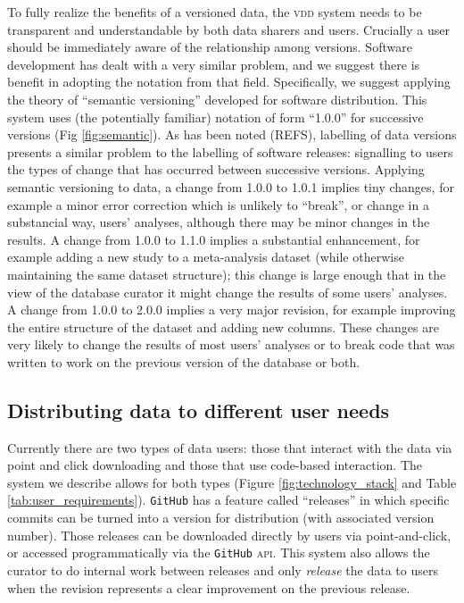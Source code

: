 \documentclass[a4paper,11pt]{article}
\begin{document}
To fully realize the benefits of a versioned data, the \textsc{vdd} system needs to be transparent and understandable by both data sharers and users.  Crucially a user should be immediately aware of the relationship among versions.  Software development has dealt with a very similar problem, and we suggest there is benefit in adopting the notation from that field.  Specifically, we suggest applying the theory of ``semantic versioning'' developed for software distribution. This system uses (the potentially familiar) notation of form ``1.0.0'' for successive versions (Fig \ref{fig:semantic}). As has been noted (REFS), labelling of data versions presents a similar problem to the labelling of software releases: signalling to users the types of change that has occurred between successive versions. Applying semantic versioning to data, a change from 1.0.0 to 1.0.1 implies tiny changes, for example a minor error correction which is unlikely to ``break'', or change in a substancial way, users' analyses, although there may be minor changes in the results. A change from 1.0.0 to 1.1.0 implies a substantial enhancement, for example adding a new study to a meta-analysis dataset (while otherwise maintaining the same dataset structure); this change is large enough that in the view of the database curator it might change the results of some users' analyses. A change from 1.0.0 to 2.0.0 implies a very major revision, for example improving the entire structure of the dataset and adding new columns. These changes are very likely to change the results of most users' analyses or to break code that was written to work on the previous version of the database or both.  


\subsection{Distributing data to different user needs}

Currently there are two types of data users: those that  interact with the data via point and click downloading and those that use code-based interaction.  The system we describe allows for both types (Figure \ref{fig:technology_stack} and Table \ref{tab:user_requirements}).  \texttt{GitHub} has a feature called ``releases'' in which specific commits can be turned into a version for distribution (with associated version number).  Those releases can be downloaded directly by users via point-and-click, or accessed programmatically via the \texttt{GitHub} \textsc{api}.  This system also allows the curator to do internal work between releases and only \emph{release} the data to users when the revision represents a clear improvement on the previous release.  
\end{document}
